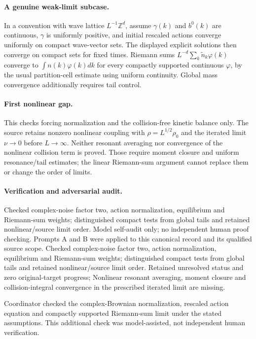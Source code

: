 \documentclass[11pt]{article}
\begin{document}
\paragraph{A genuine weak-limit subcase.} In a convention with wave lattice $L^{-1}\mathbb Z^d$, assume $\gamma(k)$ and $b^0(k)$ are continuous, $\gamma$ is uniformly positive, and initial rescaled actions converge uniformly on compact wave-vector sets. The displayed explicit solutions then converge on compact sets for fixed times. Riemann sums $L^{-d}\sum_k\widetilde n_k\varphi(k)$ converge to $\int n(k)\varphi(k)dk$ for every compactly supported continuous $\varphi$, by the usual partition-cell estimate using uniform continuity. Global mass convergence additionally requires tail control.

\paragraph{First nonlinear gap.} This checks forcing normalization and the collision-free kinetic balance only. The source retains nonzero nonlinear coupling with $\rho=L^{1/2}\rho_0$ and the iterated limit $\nu\to0$ before $L\to\infty$. Neither resonant averaging nor convergence of the nonlinear collision term is proved. Those require moment closure and uniform resonance/tail estimates; the linear Riemann-sum argument cannot replace them or change the order of limits.

\paragraph{Verification and adversarial audit.}
Checked complex-noise factor two, action normalization, equilibrium and Riemann-sum weights; distinguished compact tests from global tails and retained nonlinear/source limit order. Model self-audit only; no independent human proof checking. Prompts A and B were applied to this canonical record and its qualified source scope. Checked complex-noise factor two, action normalization, equilibrium and Riemann-sum weights; distinguished compact tests from global tails and retained nonlinear/source limit order. Retained unresolved status and zero original-target progress; Nonlinear resonant averaging, moment closure and collision-integral convergence in the prescribed iterated limit are missing.

Coordinator checked the complex-Brownian normalization, rescaled action equation and compactly supported Riemann-sum limit under the stated assumptions. This additional check was model-assisted, not independent human verification.
\end{document}
